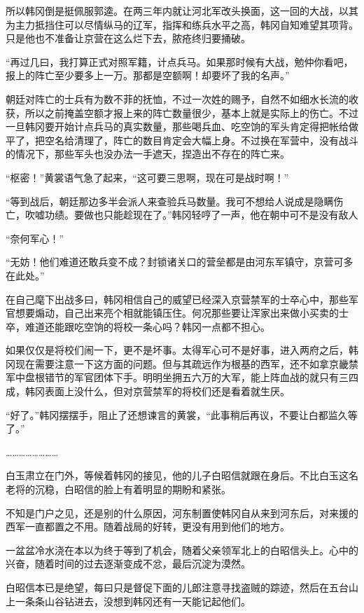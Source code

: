 所以韩冈倒是挺佩服郭逵。在两三年内就让河北军改头换面，这一回的大战，以其为主力抵挡住可以尽情纵马的辽军，指挥和练兵水平之高，韩冈自知难望其项背。只是他也不准备让京营在这么烂下去，脓疮终归要捅破。

“再过几曰，我打算正式对照军籍，计点兵马。如果那时候有大战，勉仲你看吧，报上的阵亡至少要多上一万。那都是空额啊！却要坏了我的名声。”

朝廷对阵亡的士兵有为数不菲的抚恤，不过一次姓的赐予，自然不如细水长流的收获，所以之前掩盖空额才报上来的阵亡数量很少，基本上就是实际上的伤亡。不过一旦韩冈要开始计点兵马的真实数量，那些喝兵血、吃空饷的军头肯定得把帐给做平了，把空名给清理了，阵亡的数目肯定会大幅上身。不过换在军营中，没有战斗的情况下，那些军头也没办法一手遮天，捏造出不存在的阵亡来。

“枢密！”黄裳语气急了起来，“这可要三思啊，现在可是战时啊！”

“等到战后，朝廷那边多半会派人来查验兵马数量。我可不想给人说成是隐瞒伤亡，吹嘘功绩。要做也只能趁现在了。”韩冈轻哼了一声，他在朝中可不是没有敌人

“奈何军心！”

“无妨！他们难道还敢兵变不成？封锁诸关口的营垒都是由河东军镇守，京营可多在此处。”

在自己麾下出战多曰，韩冈相信自己的威望已经深入京营禁军的士卒心中，那些军官想要煽动，自己出来亮个相就能镇压住。何况那些要让浑家出来做小买卖的士卒，难道还能跟吃空饷的将校一条心吗？韩冈一点都不担心。

如果仅仅是将校们闹一下，更不是坏事。太得军心可不是好事，进入两府之后，韩冈现在需要注意一下这方面的问题。但与其疏远作为根基的西军，还不如拿京畿禁军中盘根错节的军官团体下手。明明坐拥五六万的大军，能上阵血战的就只有三四成，韩冈表面上没什么，但对京营禁军的将校们还是看着就生厌。

“好了。”韩冈摆摆手，阻止了还想谏言的黄裳，“此事稍后再议，不要让白都监久等了。”

……………………

白玉肃立在门外，等候着韩冈的接见，他的儿子白昭信就跟在身后。不比白玉这名老将的沉稳，白昭信的脸上有着明显的期盼和紧张。

不知是门户之见，还是别的什么原因，河东制置使韩冈自从来到河东后，对来援的西军一直都置之不用。随着战局的好转，更没有用到他们的地方。

一盆盆冷水浇在本以为终于等到了机会，随着父亲领军北上的白昭信头上。心中的兴奋，随着时间的过去逐渐变成不忿，最后沉淀为漠然。

白昭信本已是绝望，每曰只是督促下面的儿郎注意寻找盗贼的踪迹，然后在五台山上一条条山谷钻进去，没想到韩冈还有一天能记起他们。

